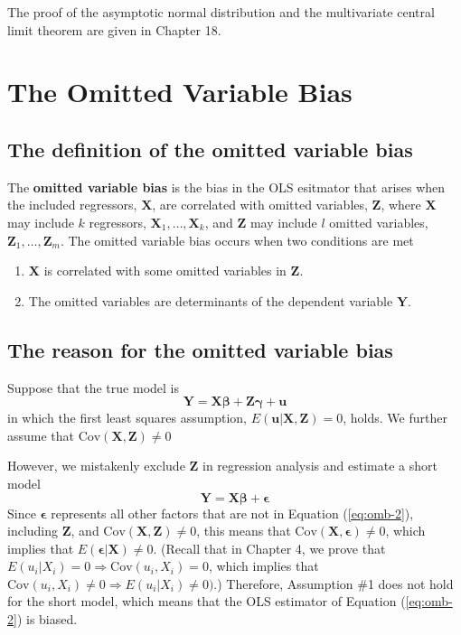 \documentclass[a4paper,11pt]{article}
\newcommand{\cov}{\mathrm{Cov}}
\begin{document}
The proof of the asymptotic normal distribution and the multivariate
central limit theorem are given in Chapter 18.


\section{The Omitted Variable Bias}
\label{sec:orgb030c99}

\subsection{The definition of the omitted variable bias}
\label{sec:org1e916df}
The \textbf{omitted variable bias} is the bias in the OLS esitmator that arises
when the included regressors, \(\mathbf{X}\), are correlated with
omitted variables, \(\mathbf{Z}\), where \(\mathbf{X}\) may include \(k\)
regressors, \(\mathbf{X}_1, \ldots, \mathbf{X}_k\), and \(\mathbf{Z}\)
may include \(l\) omitted variables, \(\mathbf{Z}_1, \ldots,
 \mathbf{Z}_m\). The omitted variable bias occurs
when two conditions are met
\begin{enumerate}
\item \(\mathbf{X}\) is correlated with some omitted variables in \(\mathbf{Z}\).
\item The omitted variables are determinants of the dependent variable
\(\mathbf{Y}\).
\end{enumerate}


\subsection{The reason for the omitted variable bias}
\label{sec:orga163564}
Suppose that the true model is
\begin{equation}
\label{eq:omb-1}
\mathbf{Y} = \mathbf{X}\boldsymbol{\beta} + \mathbf{Z}\boldsymbol{\gamma} + \mathbf{u}
\end{equation}
in which the first least squares assumption, \(E(\mathbf{u} |
\mathbf{X}, \mathbf{Z}) = 0\), holds. We further assume that \(\cov(\mathbf{X}, \mathbf{Z})
\neq 0\)

However, we mistakenly exclude \(\mathbf{Z}\) in regression analysis and
estimate a short model
\begin{equation}
\label{eq:omb-2}
\mathbf{Y} = \mathbf{X}\boldsymbol{\beta} + \boldsymbol{\epsilon}
\end{equation}
Since \(\boldsymbol{\epsilon}\) represents all other factors that are not
in Equation (\ref{eq:omb-2}), including \(\mathbf{Z}\), and
\(\cov(\mathbf{X}, \mathbf{Z}) \neq 0\), this means that
\(\cov(\mathbf{X}, \boldsymbol{\epsilon}) \neq 0\), which implies that
\(E(\boldsymbol{\epsilon} | \mathbf{X}) \neq 0\). (Recall that in
Chapter 4, we prove that \(E(u_i | X_i) = 0 \Rightarrow \cov(u_i, X_i)
= 0\), which implies that \(\cov(u_i, X_i) \neq 0 \Rightarrow E(u_i |
X_i) \neq 0)\).) Therefore, Assumption \#1 does not hold for the short
model, which means that the OLS estimator of Equation (\ref{eq:omb-2})
is biased.
\end{document}
